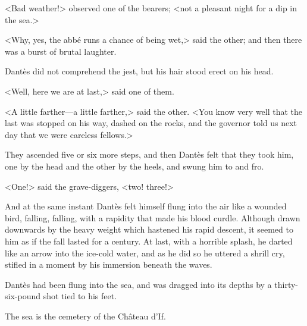 <Bad weather!> observed one of the bearers; <not a pleasant night for a dip in the sea.> 

 <Why, yes, the abbé runs a chance of being wet,> said the other; and then there was a burst of brutal laughter. 

 Dantès did not comprehend the jest, but his hair stood erect on his head. 

 <Well, here we are at last,> said one of them. 

 <A little farther—a little farther,> said the other. <You know very well that the last was stopped on his way, dashed on the rocks, and the governor told us next day that we were careless fellows.> 

 They ascended five or six more steps, and then Dantès felt that they took him, one by the head and the other by the heels, and swung him to and fro. 

 <One!> said the grave-diggers, <two! three!> 

 And at the same instant Dantès felt himself flung into the air like a wounded bird, falling, falling, with a rapidity that made his blood curdle. Although drawn downwards by the heavy weight which hastened his rapid descent, it seemed to him as if the fall lasted for a century. At last, with a horrible splash, he darted like an arrow into the ice-cold water, and as he did so he uttered a shrill cry, stifled in a moment by his immersion beneath the waves. 

 Dantès had been flung into the sea, and was dragged into its depths by a thirty-six-pound shot tied to his feet. 

 The sea is the cemetery of the Château d'If.